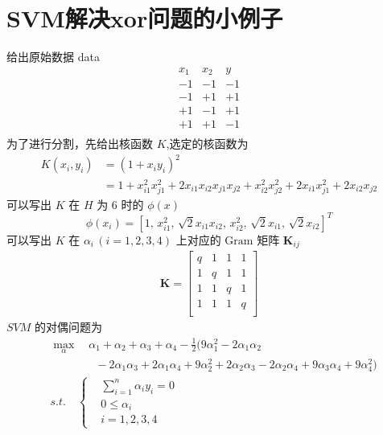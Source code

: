 \section{SVM解决xor问题的小例子}
	给出原始数据 data
	\[
	\begin{matrix}
		x_1 & x_2 & y \\
		-1 & -1 & -1 \\
		-1 & +1 & +1 \\
		+1 & -1 & +1 \\
		+1 & +1 & -1 \\
	\end{matrix}
	\]
	为了进行分割，先给出核函数 $K$,选定的核函数为
	\begin{align*}
		K(x_i, y_i) &= (1 + x_i y_i)^2 \\
				   &= 1 + x_{i1}^2 x_{j1}^2 + 2 x_{i1}x_{i2}x_{j1}x_{j2} + x_{i2}^2 x_{j2}^2 + 2x_{i1}x_{j1}^2 + 2x_{i2}x_{j2}
	\end{align*}
	可以写出 $K$ 在 $H$ 为 6 时的 $ \phi(x) $
	\[
	\phi(x_i) = \left[ 1, \, x_{i1}^2, \, \sqrt{2} x_{i1}x_{i2}, \, x_{i2}^2, \, \sqrt{2}x_{i1}, \, \sqrt{2}x_{i2}  \right]^T
	\]
	可以写出 $K$ 在 $ \alpha_i \, (i=1,2,3,4) $ 上对应的 $\mathrm{Gram}$ 矩阵 $\mathbf{K}_{ij}$ \\
	\begin{align*}
	\mathbf{K} =
	\begin{bmatrix}
		q & 1 & 1 & 1 \\
		1 & q & 1 & 1 \\
		1 & 1 & q & 1 \\
		1 & 1 & 1 & q \\
	\end{bmatrix}
	\end{align*}
	$ SVM $ 的对偶问题为
	\begin{align*}
	& \max_{\alpha} \quad \alpha_1 + \alpha_2 + \alpha_3 + \alpha_4 - \frac{1}{2} (9 \alpha_1^2 - 2 \alpha_1 \alpha_2 \\
	& \qquad \qquad -2 \alpha_1 \alpha_3 + 2 \alpha_1 \alpha_4 + 9 \alpha_2^2 + 2 \alpha_2 \alpha_3 -2 \alpha_2 \alpha_4 + 9 \alpha_3 \alpha_4 + 9 \alpha_4^2 ) \\
	& s.t. \quad \left\{
	\begin{aligned}
	& \sum_{i=1}^{n} \alpha_i y_i = 0 \\
	& 0 \leqslant \alpha_i \\
	& i = 1,2,3,4
	\end{aligned}
	\right.
	\end{align*}

